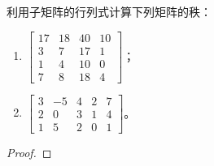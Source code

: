 \begin{problem}
利用子矩阵的行列式计算下列矩阵的秩：
\begin{enumerate}
    \item \(\begin{bmatrix}
              17 & 18 & 40 & 10 \\
              3  & 7  & 17 & 1  \\
              1  & 4  & 10 & 0  \\
              7  & 8  & 18 & 4
          \end{bmatrix}\)；
    \item \(\begin{bmatrix}
              3 & -5 & 4 & 2 & 7 \\
              2 & 0  & 3 & 1 & 4 \\
              1 & 5  & 2 & 0 & 1
          \end{bmatrix}\)。
\end{enumerate}
\end{problem}
\begin{proof}
\end{proof}